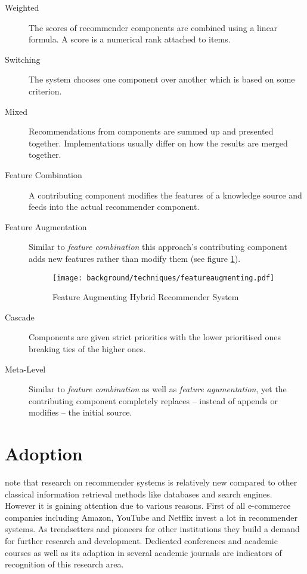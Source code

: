 \begin{description}
    \item[Weighted] The scores of recommender components are combined using a linear formula. A score is a numerical rank attached to items.
    \item[Switching] The system chooses one component over another which is based on some criterion.
    \item[Mixed] Recommendations from components are summed up and presented together. Implementations usually differ on how the results are merged together.
    \item[Feature Combination] A contributing component modifies the features of a knowledge source and feeds into the actual recommender component.
    \item[Feature Augmentation] Similar to \textit{feature combination} this approach's contributing component adds new features rather than modify them (see figure \ref{fig:featureaugmenting}).

    \begin{figure}[ht]
        \texttt{[image: background/techniques/featureaugmenting.pdf]}
        \caption{Feature Augmenting Hybrid Recommender System}
        \label{fig:featureaugmenting}
    \end{figure}

    \item[Cascade] Components are given strict priorities with the lower prioritised ones breaking ties of the higher ones.
    \item[Meta-Level] Similar to \textit{feature combination} as well as \textit{feature agumentation}, yet the contributing component completely replaces -- instead of appends or modifies -- the initial source.
\end{description}

\section{Adoption}
\label{bg-adoption}

\citet{ricci11} note that research on recommender systems is relatively new compared to other classical information retrieval methods like databases and search engines. However it is gaining attention due to various reasons. First of all e-commerce companies including Amazon, YouTube and Netflix invest a lot in recommender systems. As trendsetters and pioneers for other institutions they build a demand for further research and development. Dedicated conferences and academic courses as well as its adaption in several academic journals are indicators of recognition of this research area.

